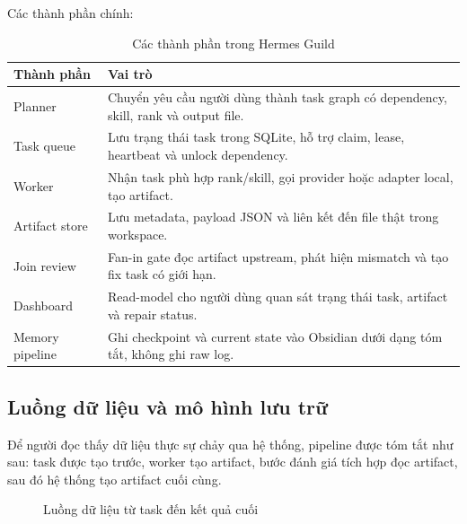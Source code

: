 \documentclass[12pt,a4paper]{article}
\begin{document}
Các thành phần chính:

\begin{table}[H]
\centering
\caption{Các thành phần trong Hermes Guild}
\begin{tabular}{p{}p{}}
\toprule
\textbf{Thành phần} & \textbf{Vai trò} \\
\midrule
Planner & Chuyển yêu cầu người dùng thành task graph có dependency, skill, rank và output file. \\
Task queue & Lưu trạng thái task trong SQLite, hỗ trợ claim, lease, heartbeat và unlock dependency. \\
Worker & Nhận task phù hợp rank/skill, gọi provider hoặc adapter local, tạo artifact. \\
Artifact store & Lưu metadata, payload JSON và liên kết đến file thật trong workspace. \\
Join review & Fan-in gate đọc artifact upstream, phát hiện mismatch và tạo fix task có giới hạn. \\
Dashboard & Read-model cho người dùng quan sát trạng thái task, artifact và repair status. \\
Memory pipeline & Ghi checkpoint và current state vào Obsidian dưới dạng tóm tắt, không ghi raw log. \\
\bottomrule
\end{tabular}
\end{table}

\subsection{Luồng dữ liệu và mô hình lưu trữ}

Để người đọc thấy dữ liệu thực sự chảy qua hệ thống, pipeline được tóm tắt như sau: task được tạo trước, worker tạo artifact, bước đánh giá tích hợp đọc artifact, sau đó hệ thống tạo artifact cuối cùng.

\begin{figure}[H]
    \centering
    \caption{Luồng dữ liệu từ task đến kết quả cuối}
\end{figure}
\end{document}
